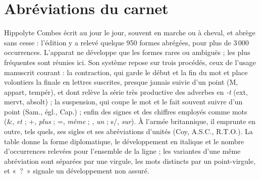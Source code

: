 \section{Abréviations du carnet}

Hippolyte Combes écrit au jour le jour, souvent en marche ou à cheval, et abrège sans cesse : l'édition y a relevé quelque 950 formes abrégées, pour plus de 3\,000 occurrences. L'apparat ne développe que les formes rares ou ambiguës ; les plus fréquentes sont réunies ici. Son système repose sur trois procédés, ceux de l'usage manuscrit courant : la contraction, qui garde le début et la fin du mot et place volontiers la finale en lettres suscrites, presque jamais suivie d'un point ({\LJpolice M, appart, tempér}), et dont relève la série très productive des adverbes en \textit{-t} ({\LJpolice ext, mervt, absolt}) ; la suspension, qui coupe le mot et le fait souvent suivre d'un point ({\LJpolice Sam., égl., Cap.}) ; enfin des signes et des chiffres employés comme mots ({\LJpolice \&}, \textit{et} ; {\LJpolice +}, \textit{plus} ; {\LJpolice =}, \textit{même} ; {}, \textit{un} ; {\LJpolice s/}, \textit{sur}). À l'armée britannique, il emprunte en outre, tels quels, ses sigles et ses abréviations d'unités ({\LJpolice Coy, A.S.C., R.T.O.}). La table donne la forme diplomatique, le développement en italique et le nombre d'occurrences relevées pour l'ensemble de la ligne ; les variantes d'une même abréviation sont séparées par une virgule, les mots distincts par un point-virgule, et «~?~» signale un développement non assuré.

